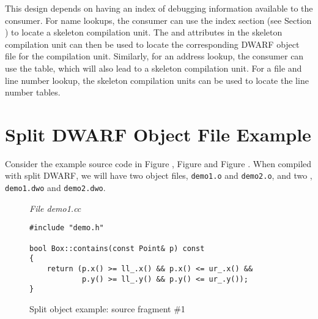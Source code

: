 This design depends on having an index of debugging information
available to the consumer. For name lookups, the consumer can 
use the \dotdebugnames{} index section (see 
Section ) to 
locate a skeleton compilation unit. The
\DWATcompdir{} and \DWATdwoname{} attributes in the skeleton
compilation unit can then be used to locate the corresponding
DWARF object file for the compilation unit. Similarly, for an
address lookup, the consumer can use the \dotdebugaranges{} table,
which will also lead to a skeleton compilation unit. For a file
and line number lookup, the skeleton compilation units can be
used to locate the line number tables.

\section{Split DWARF Object File Example}
\label{app:splitdwarfobjectfileexample}
Consider the example source code in 
Figure , 
Figure  and
Figure .
When compiled with split DWARF, we will have two object files,
\texttt{demo1.o} and \texttt{demo2.o}, and two , 
\texttt{demo1.dwo} and \texttt{demo2.dwo}.

\begin{figure}[b]
\textit{File demo1.cc}
\begin{lstlisting}
#include "demo.h"

bool Box::contains(const Point& p) const
{
    return (p.x() >= ll_.x() && p.x() <= ur_.x() &&
            p.y() >= ll_.y() && p.y() <= ur_.y());
}
\end{lstlisting}
\caption{Split object example: source fragment \#1}
\label{fig:splitobjectexamplesourcefragment1}
\end{figure}

